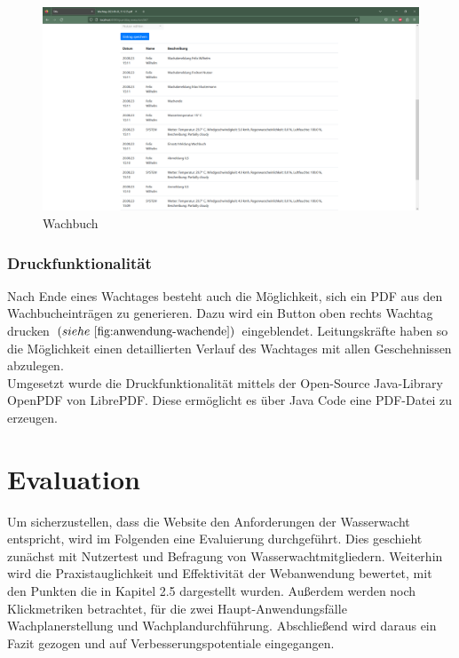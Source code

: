 \documentclass[fontsize=12pt,openright,oneside,paper=a4,BCOR=1cm]{scrbook}
\begin{document}
\begin{figure}[H]
  \centering
    \includegraphics[width=0.7\linewidth]{Anlagen/Anwendung/8-6WachtagWachbuchLog.png}
    \caption{Wachbuch}
  \label{fig:anwendung-wachbuch}
\end{figure}


\subsection{Druckfunktionalität}

Nach Ende eines Wachtages besteht auch die M\"oglichkeit, sich ein PDF aus den Wachbucheintr\"agen zu generieren. Dazu wird ein Button oben rechts \glqq Wachtag drucken\grqq{} $(siehe~\ref{fig:anwendung-wachende})$ eingeblendet. Leitungskr\"afte haben so die M\"oglichkeit einen detaillierten Verlauf des Wachtages mit allen Geschehnissen abzulegen. \\
Umgesetzt wurde die Druckfunktionalit\"at mittels der Open-Source Java-Library OpenPDF von LibrePDF. Diese erm\"oglicht es \"uber Java Code eine PDF-Datei zu erzeugen.\\



%
%

\newpage
\chapter{Evaluation}

Um sicherzustellen, dass die Website den Anforderungen der Wasserwacht entspricht, wird im Folgenden eine Evaluierung durchgeführt. Dies geschieht zunächst mit Nutzertest und Befragung von Wasserwachtmitgliedern. Weiterhin wird die Praxistauglichkeit und Effektivität der Webanwendung bewertet, mit den Punkten die in Kapitel 2.5 dargestellt wurden. Außerdem werden noch \glqq Klickmetriken\grqq{} betrachtet, für die zwei Haupt-Anwendungsfälle Wachplanerstellung und Wachplandurchführung. Abschließend wird daraus ein Fazit gezogen und auf Verbesserungspotentiale eingegangen. 
\end{document}
